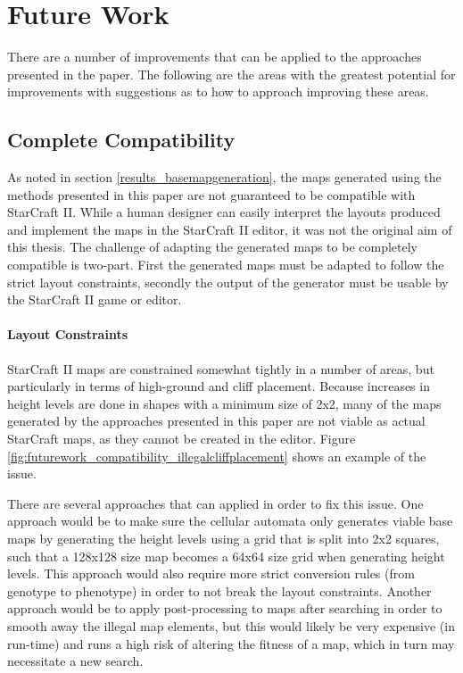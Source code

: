 \chapter{Future Work}
\label{futurework}
There are a number of improvements that can be applied to the approaches presented in the paper. The following are the areas with the greatest potential for improvements with suggestions as to how to approach improving these areas.
\section{Complete Compatibility}
\label{futurework_compatibility}
As noted in section \ref{results_basemapgeneration}, the maps generated using the methods presented in this paper are not guaranteed to be compatible with StarCraft II. While a human designer can easily interpret the layouts produced and implement the maps in the StarCraft II editor, it was not the original aim of this thesis. The challenge of adapting the generated maps to be completely compatible is two-part. First the generated maps must be adapted to follow the strict layout constraints, secondly the output of the generator must be usable by the StarCraft II game or editor. 

\subsubsection{Layout Constraints}
StarCraft II maps are constrained somewhat tightly in a number of areas, but particularly in terms of high-ground and cliff placement. Because increases in height levels are done in shapes with a minimum size of 2x2, many of the maps generated by the approaches presented in this paper are not viable as actual StarCraft maps, as they cannot be created in the editor. Figure \ref{fig:futurework_compatibility_illegalcliffplacement} shows an example of the issue.


There are several approaches that can applied in order to fix this issue. One approach would be to make sure the cellular automata only generates viable base maps by generating the height levels using a grid that is split into 2x2 squares, such that a 128x128 size map becomes a 64x64 size grid when generating height levels. This approach would also require more strict conversion rules (from genotype to phenotype) in order to not break the layout constraints. Another approach would be to apply post-processing to maps after searching in order to smooth away the illegal map elements, but this would likely be very expensive (in run-time) and runs a high risk of altering the fitness of a map, which in turn may necessitate a new search. 

